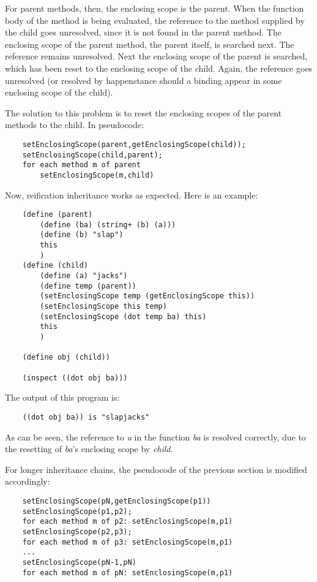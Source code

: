 For parent methods, then, the enclosing scope is the parent.  When the
function body of the method is being evaluated, the reference to the
method supplied by the child goes unresolved, since it is not found in
the parent method. The enclosing scope of the parent method, the parent
itself, is searched next.  The reference remains unresolved. Next the
enclosing scope of the parent is searched, which has been reset to the
enclosing scope of the child. Again, the reference goes unresolved (or
resolved by happenstance should a binding appear in some enclosing scope
of the child).

The solution to this problem is to reset the enclosing scopes of the
parent methods to the child. In pseudocode:

\begin{verbatim}
    setEnclosingScope(parent,getEnclosingScope(child));
    setEnclosingScope(child,parent);
    for each method m of parent
        setEnclosingScope(m,child)
\end{verbatim}

Now, reification inheritance works as expected. Here is an example:

\begin{verbatim}
    (define (parent)
        (define (ba) (string+ (b) (a)))
        (define (b) "slap")
        this
        )
    (define (child)
        (define (a) "jacks")
        (define temp (parent))
        (setEnclosingScope temp (getEnclosingScope this))
        (setEnclosingScope this temp)
        (setEnclosingScope (dot temp ba) this)
        this
        )

    (define obj (child))

    (inspect ((dot obj ba)))
\end{verbatim}

The output of this program is:

\begin{verbatim}
    ((dot obj ba)) is "slapjacks"
\end{verbatim}

As can be seen, the reference to {\it a} in the function {\it ba} is
resolved correctly, due to the resetting of {\it ba}'s enclosing scope
by {\it child}.

For longer inheritance chains, the pseudocode of the previous section
is modified accordingly:

\begin{verbatim}
    setEnclosingScope(pN,getEnclosingScope(p1))
    setEnclosingScope(p1,p2);
    for each method m of p2: setEnclosingScope(m,p1)
    setEnclosingScope(p2,p3);
    for each method m of p3: setEnclosingScope(m,p1)
    ...
    setEnclosingScope(pN-1,pN)
    for each method m of pN: setEnclosingScope(m,p1)
\end{verbatim}

